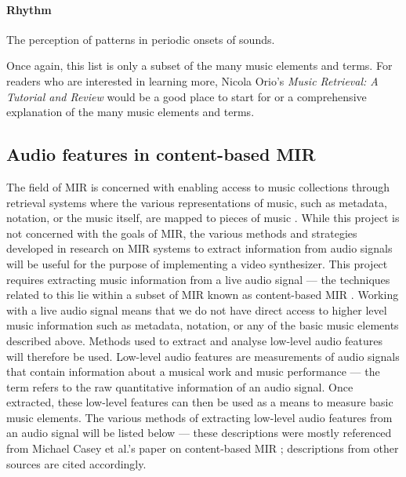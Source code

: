 \documentclass[../initial_thesis.tex]{subfiles}
\begin{document}
\paragraph{Rhythm} The perception of patterns in periodic onsets of sounds. \\
\par

Once again, this list is only a subset of the many music elements and terms. For readers who are interested in learning more, Nicola Orio's \textit{Music Retrieval: A Tutorial and Review} \cite{Orio2006} would be a good place to start for or a comprehensive explanation of the many music elements and terms.

\subsection{Audio features in content-based MIR}\label{sec:lowlevelaudio}
The field of MIR is concerned with enabling access to music collections through retrieval systems where the various representations of music, such as metadata, notation, or the music itself, are mapped to pieces of music \cite{Downie}. While this project is not concerned with the goals of MIR, the various methods and strategies developed in research on MIR systems to extract information from audio signals will be useful for the purpose of implementing a video synthesizer. This project requires extracting music information from a live audio signal --- the techniques related to this lie within a subset of MIR known as content-based MIR \cite{Casey2008}. Working with a live audio signal means that we do not have direct access to higher level music information such as metadata, notation, or any of the basic music elements described above. Methods used to extract and analyse low-level audio features will therefore be used. Low-level audio features are measurements of audio signals that contain information about a musical work and music performance \cite{Casey2008} --- the term refers to the raw quantitative information of an audio signal. Once extracted, these low-level features can then be used as a means to measure basic music elements. The various methods of extracting low-level audio features from an audio signal will be listed below --- these descriptions were mostly referenced from Michael Casey et al.'s paper on content-based MIR \cite{Casey2008}; descriptions from other sources are cited accordingly.
\end{document}
